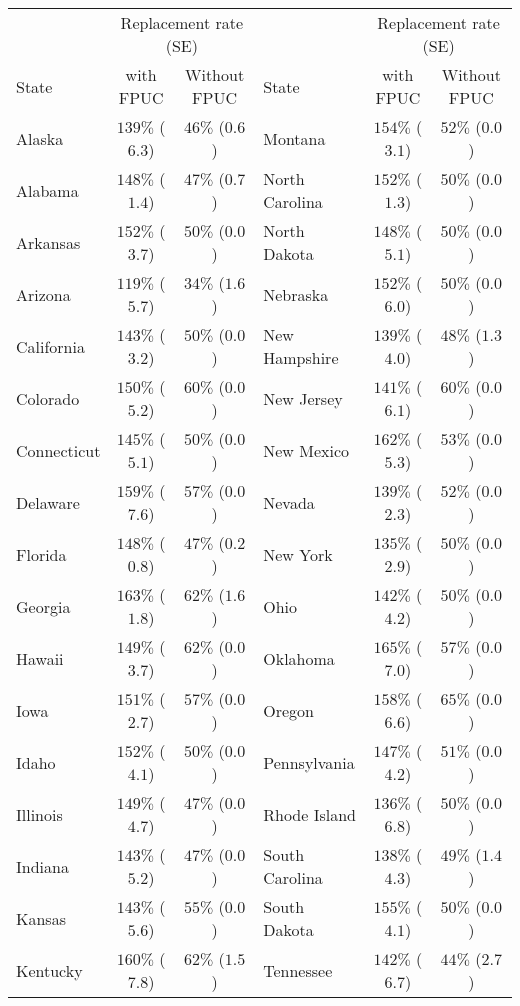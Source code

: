 \begin{tabular}{lcclcc}
\toprule
& \multicolumn{2}{c}{Replacement rate (SE)} & & \multicolumn{2}{c}{Replacement rate (SE)} \\ 
 \cmidrule(lr){2-3}\cmidrule(lr){5-6}
State & with FPUC & Without FPUC & State & with FPUC & Without FPUC \\ 
\midrule
Alaska & $139\%$ ($6.3$)  & $46\%$ ($0.6$)  & Montana & $154\%$ ($3.1$)  & $52\%$ ($0.0$)  \\ 
Alabama & $148\%$ ($1.4$)  & $47\%$ ($0.7$)  & North Carolina & $152\%$ ($1.3$)  & $50\%$ ($0.0$)  \\ 
Arkansas & $152\%$ ($3.7$)  & $50\%$ ($0.0$)  & North Dakota & $148\%$ ($5.1$)  & $50\%$ ($0.0$)  \\ 
Arizona & $119\%$ ($5.7$)  & $34\%$ ($1.6$)  & Nebraska & $152\%$ ($6.0$)  & $50\%$ ($0.0$)  \\ 
California & $143\%$ ($3.2$)  & $50\%$ ($0.0$)  & New Hampshire & $139\%$ ($4.0$)  & $48\%$ ($1.3$)  \\ 
Colorado & $150\%$ ($5.2$)  & $60\%$ ($0.0$)  & New Jersey & $141\%$ ($6.1$)  & $60\%$ ($0.0$)  \\ 
Connecticut & $145\%$ ($5.1$)  & $50\%$ ($0.0$)  & New Mexico & $162\%$ ($5.3$)  & $53\%$ ($0.0$)  \\ 
Delaware & $159\%$ ($7.6$)  & $57\%$ ($0.0$)  & Nevada & $139\%$ ($2.3$)  & $52\%$ ($0.0$)  \\ 
Florida & $148\%$ ($0.8$)  & $47\%$ ($0.2$)  & New York & $135\%$ ($2.9$)  & $50\%$ ($0.0$)  \\ 
Georgia & $163\%$ ($1.8$)  & $62\%$ ($1.6$)  & Ohio & $142\%$ ($4.2$)  & $50\%$ ($0.0$)  \\ 
Hawaii & $149\%$ ($3.7$)  & $62\%$ ($0.0$)  & Oklahoma & $165\%$ ($7.0$)  & $57\%$ ($0.0$)  \\ 
Iowa & $151\%$ ($2.7$)  & $57\%$ ($0.0$)  & Oregon & $158\%$ ($6.6$)  & $65\%$ ($0.0$)  \\ 
Idaho & $152\%$ ($4.1$)  & $50\%$ ($0.0$)  & Pennsylvania & $147\%$ ($4.2$)  & $51\%$ ($0.0$)  \\ 
Illinois & $149\%$ ($4.7$)  & $47\%$ ($0.0$)  & Rhode Island & $136\%$ ($6.8$)  & $50\%$ ($0.0$)  \\ 
Indiana & $143\%$ ($5.2$)  & $47\%$ ($0.0$)  & South Carolina & $138\%$ ($4.3$)  & $49\%$ ($1.4$)  \\ 
Kansas & $143\%$ ($5.6$)  & $55\%$ ($0.0$)  & South Dakota & $155\%$ ($4.1$)  & $50\%$ ($0.0$)  \\ 
Kentucky & $160\%$ ($7.8$)  & $62\%$ ($1.5$)  & Tennessee & $142\%$ ($6.7$)  & $44\%$ ($2.7$)  \\ 

\end{tabular}
